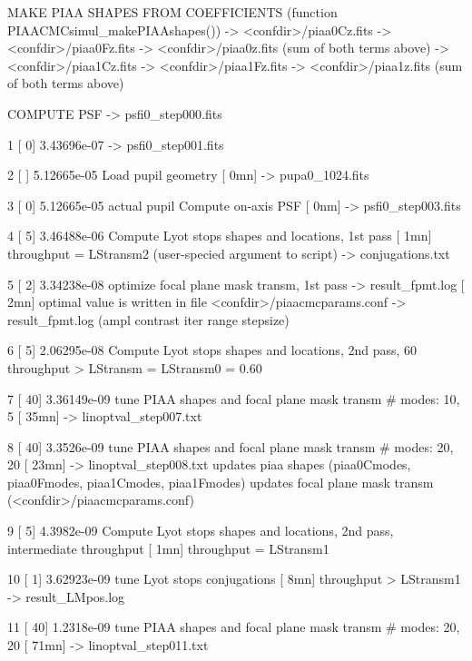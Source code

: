\begin{DoxyVerb}
\begin{DoxyVerb}
\begin{DoxyVerb}
        MAKE PIAA SHAPES FROM COEFFICIENTS (function PIAACMCsimul_makePIAAshapes())
        -> <confdir>/piaa0Cz.fits
        -> <confdir>/piaa0Fz.fits
        -> <confdir>/piaa0z.fits (sum of both terms above)
        -> <confdir>/piaa1Cz.fits
        -> <confdir>/piaa1Fz.fits
        -> <confdir>/piaa1z.fits (sum of both terms above)

        COMPUTE PSF
           -> psfi0_step000.fits

  1     [  0]   3.43696e-07
        -> psfi0_step001.fits

  2     [   ]   5.12665e-05 Load pupil geometry                                                     [   0mn]
        -> pupa0_1024.fits

  3     [  0]   5.12665e-05 actual pupil Compute on-axis PSF                                        [   0nm]
        -> psfi0_step003.fits

  4     [  5]   3.46488e-06 Compute Lyot stops shapes and locations, 1st pass                       [   1mn]
        throughput = LStransm2 (user-specied argument to script)
        -> conjugations.txt

  5     [  2]   3.34238e-08 optimize focal plane mask transm, 1st pass -> result_fpmt.log           [   2mn]
        optimal value is written in file <confdir>/piaacmcparams.conf
        -> result_fpmt.log (ampl contrast iter range stepsize)
        

  6     [  5]   2.06295e-08 Compute Lyot stops shapes and locations, 2nd pass, 60%
        throughput > LStransm = LStransm0 = 0.60

  7     [ 40]    3.36149e-09    tune PIAA shapes and focal plane mask transm # modes: 10, 5             [  35mn]
        -> linoptval_step007.txt

  8     [ 40]   3.3526e-09  tune PIAA shapes and focal plane mask transm # modes: 20, 20            [  23mn]
        -> linoptval_step008.txt 
        updates piaa shapes (piaa0Cmodes, piaa0Fmodes, piaa1Cmodes, piaa1Fmodes)
        updates focal plane mask transm (<confdir>/piaacmcparams.conf)

  9     [  5]   4.3982e-09      Compute Lyot stops shapes and locations, 2nd pass, intermediate throughput [   1mn]
        throughput = LStransm1

 10     [  1]   3.62923e-09 tune Lyot stops conjugations                                        [   8mn]
        throughput > LStransm1 
        -> result_LMpos.log

 11     [ 40]   1.2318e-09  tune PIAA shapes and focal plane mask transm # modes: 20, 20            [  71mn]
        -> linoptval_step011.txt 


\end{DoxyVerb}
\end{DoxyVerb}
\end{DoxyVerb}
